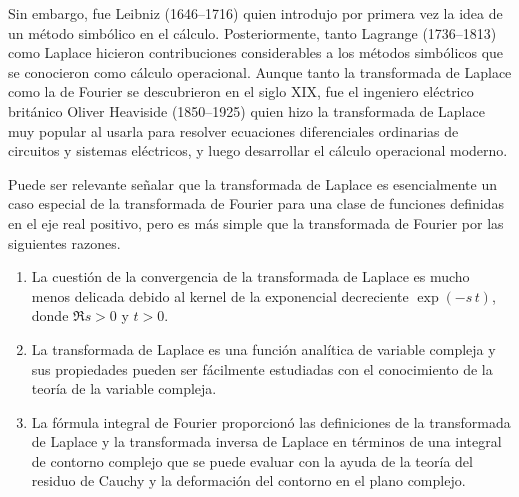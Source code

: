 \par
Sin embargo, fue Leibniz (1646–1716) quien introdujo por primera vez la idea de un método simbólico en el cálculo. Posteriormente, tanto Lagrange (1736–1813) como Laplace hicieron contribuciones considerables a los métodos simbólicos que se conocieron como cálculo operacional. Aunque tanto la transformada de Laplace como la de Fourier se descubrieron en el siglo XIX, fue el ingeniero eléctrico británico Oliver Heaviside (1850–1925) quien hizo la transformada de Laplace muy popular al usarla para resolver ecuaciones diferenciales ordinarias de circuitos y sistemas eléctricos, y luego desarrollar el cálculo operacional moderno.
\par
Puede ser relevante señalar que la transformada de Laplace es esencialmente un caso especial de la transformada de Fourier para una clase de funciones definidas en el eje real positivo, pero es más simple que la transformada de Fourier por las siguientes razones.
\begin{enumerate}
\item La cuestión de la convergencia de la transformada de Laplace es mucho menos delicada debido al kernel de la exponencial decreciente $\exp (-s \, t)$, donde $\Re{s} > 0$ y $t > 0$.
\item La transformada de Laplace es una función analítica de variable compleja y sus propiedades pueden ser fácilmente estudiadas con el conocimiento de la teoría de la variable compleja.
\item La fórmula integral de Fourier proporcionó las definiciones de la transformada de Laplace y la transformada inversa de Laplace en términos de una integral de contorno complejo que se puede evaluar con la ayuda de la teoría del residuo de Cauchy y la deformación del contorno en el plano complejo.
\end{enumerate}

